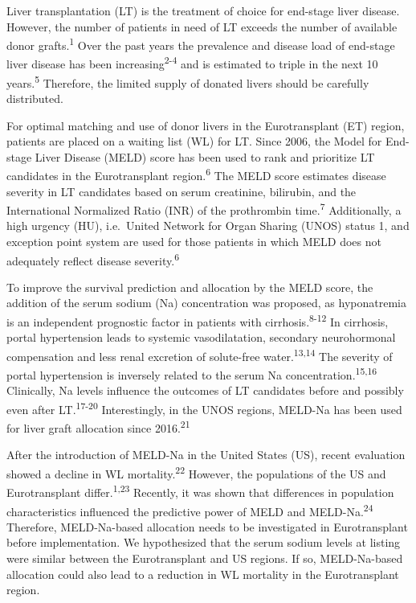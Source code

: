 \documentclass[11pt,english,]{book} %
\begin{document}
Liver transplantation (LT) is the treatment of choice for end-stage liver disease. However, the number of patients in need of LT exceeds the number of available donor grafts.\textsuperscript{1} Over the past years the prevalence and disease load of end-stage liver disease has been increasing\textsuperscript{2-4} and is estimated to triple in the next 10 years.\textsuperscript{5} Therefore, the limited supply of donated livers should be carefully distributed.

For optimal matching and use of donor livers in the Eurotransplant (ET) region, patients are placed on a waiting list (WL) for LT. Since 2006, the Model for End-stage Liver Disease (MELD) score has been used to rank and prioritize LT candidates in the Eurotransplant region.\textsuperscript{6} The MELD score estimates disease severity in LT candidates based on serum creatinine, bilirubin, and the International Normalized Ratio (INR) of the prothrombin time.\textsuperscript{7} Additionally, a high urgency (HU), i.e.~United Network for Organ Sharing (UNOS) status 1, and exception point system are used for those patients in which MELD does not adequately reflect disease severity.\textsuperscript{6}

To improve the survival prediction and allocation by the MELD score, the addition of the serum sodium (Na) concentration was proposed, as hyponatremia is an independent prognostic factor in patients with cirrhosis.\textsuperscript{8-12} In cirrhosis, portal hypertension leads to systemic vasodilatation, secondary neurohormonal compensation and less renal excretion of solute-free water.\textsuperscript{13,14} The severity of portal hypertension is inversely related to the serum Na concentration.\textsuperscript{15,16} Clinically, Na levels influence the outcomes of LT candidates before and possibly even after LT.\textsuperscript{17-20} Interestingly, in the UNOS regions, MELD-Na has been used for liver graft allocation since 2016.\textsuperscript{21}

After the introduction of MELD-Na in the United States (US), recent evaluation showed a decline in WL mortality.\textsuperscript{22} However, the populations of the US and Eurotransplant differ.\textsuperscript{1,23} Recently, it was shown that differences in population characteristics influenced the predictive power of MELD and MELD-Na.\textsuperscript{24} Therefore, MELD-Na-based allocation needs to be investigated in Eurotransplant before implementation. We hypothesized that the serum sodium levels at listing were similar between the Eurotransplant and US regions. If so, MELD-Na-based allocation could also lead to a reduction in WL mortality in the Eurotransplant region.
\end{document}
